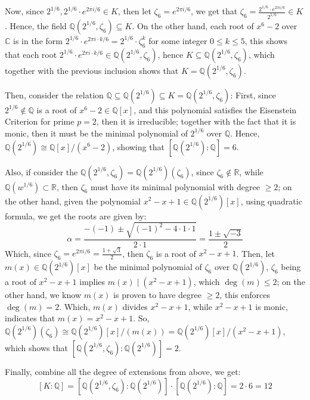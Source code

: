 \documentclass{article}
\begin{document}
\begin{itemize}
    Now, since $2^{1/6},2^{1/6}\cdot e^{2\pi i/6}\in K$, then let $\zeta_6 = e^{2\pi i/6}$, we get that $\zeta_6 = \frac{2^{1/6}\cdot e^{2\pi i/6}}{2^{1/6}}\in K$. Hence, the field $\mathbb{Q}(2^{1/6},\zeta_6)\subseteq K$. On the other hand, each root of $x^6-2$ over $\mathbb{C}$ is in the form $2^{1/6}\cdot e^{2\pi i\cdot k/6} = 2^{1/6}\cdot \zeta_6^k$ for some integer $0\leq k\leq 5$, this shows that each root $2^{1/6}\cdot e^{2\pi i\cdot k/6}\in \mathbb{Q}(2^{1/6},\zeta_6)$, hence $K\subseteq\mathbb{Q}(2^{1/6},\zeta_6)$, which together with the previous inclusion shows that $K = \mathbb{Q}(2^{1/6},\zeta_6)$.

    Then, consider the relation $\mathbb{Q}\subseteq \mathbb{Q}(2^{1/6})\subseteq K=\mathbb{Q}(2^{1/6},\zeta_6)$: First, since $2^{1/6}\notin \mathbb{Q}$ is a root of $x^6-2\in\mathbb{Q}[x]$, and this polynomial satisfies the Eisenstein Criterion for prime $p=2$, then it is irreducible; together with the fact that it is monic, then it must be the minimal polynomial of $2^{1/6}$ over $\mathbb{Q}$. Hence, $\mathbb{Q}(2^{1/6})\cong \mathbb{Q}[x]/(x^6-2)$, showing that $[\mathbb{Q}(2^{1/6}):\mathbb{Q}]=6$.

    Also, if consider the $\mathbb{Q}(2^{1/6},\zeta_6)=\mathbb{Q}(2^{1/6})(\zeta_6)$, since $\zeta_6\notin\mathbb{R}$, while $\mathbb{Q}(w^{1/6})\subset \mathbb{R}$, then $\zeta_6$ must have its minimal polynomial with degree $\geq 2$; on the other hand, given the polynomial $x^2-x+1\in\mathbb{Q}(2^{1/6})[x]$, using quadratic formula, we get the roots are given by:
    $$\alpha = \frac{-(-1)\pm\sqrt{(-1)^2-4\cdot 1\cdot 1}}{2\cdot 1} = \frac{1\pm\sqrt{-3}}{2}$$
    Which, since $\zeta_6 = e^{2\pi i/6} = \frac{1+\sqrt{3}}{2}$, then $\zeta_6$ is a root of $x^2-x+1$. Then, let $m(x)\in\mathbb{Q}(2^{1/6})[x]$ be the minimal polynomial of $\zeta_6$ over $\mathbb{Q}(2^{1/6})$, $\zeta_6$ being a root of $x^2-x+1$ implies $m(x)\mid (x^2-x+1)$, which $\deg(m)\leq 2$; on the other hand, we know $m(x)$ is proven to have degree $\geq 2$, this enforces $\deg(m)=2$. Which, $m(x)$ divides $x^2-x+1$, while $x^2-x+1$ is monic, indicates that $m(x)=x^2-x+1$.
    So, $\mathbb{Q}(2^{1/6})(\zeta_6) \cong \mathbb{Q}(2^{1/6})[x]/(m(x))=\mathbb{Q}(2^{1/6})[x]/(x^2-x+1)$, which shows that $[\mathbb{Q}(2^{1/6},\zeta_6):\mathbb{Q}(2^{1/6})]=2$.

    Finally, combine all the degree of extensions from above, we get:
    $$[K:\mathbb{Q}] = [\mathbb{Q}(2^{1/6},\zeta_6):\mathbb{Q}(2^{1/6})]\cdot [\mathbb{Q}(2^{1/6}):\mathbb{Q}] = 2\cdot 6 = 12$$


\end{itemize}
\end{document}
